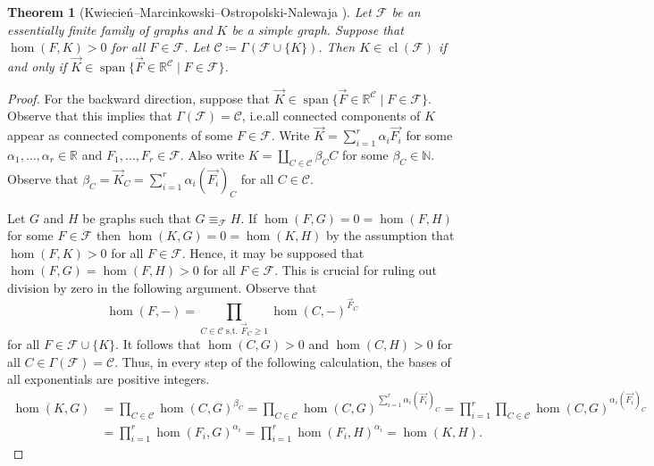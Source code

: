 \documentclass[3p,final]{elsarticle}
\DeclareMathOperator{\spn}{span}
\DeclareMathOperator{\cl}{cl}
\newtheorem{theorem}{Theorem}
\begin{document}
	
	\begin{theorem}[Kwiecie{\'n}--Marcinkowski--Ostropolski-Nalewaja \cite{kwiecien_determinacy_2022}] \label{thm:kwiecien22}
		Let $\mathcal{F}$ be an essentially finite family of graphs and $K$ be a simple graph. 
		Suppose that $\hom(F, K) > 0$ for all $F \in \mathcal{F}$.
		Let $\mathcal{C} \coloneqq \Gamma(\mathcal{F} \cup \{K\})$.
		Then $K \in \cl(\mathcal{F})$ if and only if $\vec{K} \in \spn \{\vec{F} \in \mathbb{R}^{\mathcal{C}} \mid F \in \mathcal{F}\}$.
	\end{theorem}
	\begin{proof}
		For the backward direction, suppose that $\vec{K} \in \spn \{\vec{F} \in \mathbb{R}^{\mathcal{C}} \mid F \in \mathcal{F}\}$. 
		Observe that this implies that $\Gamma(\mathcal{F}) = \mathcal{C}$, i.e.\@ all connected components of $K$ appear as connected components of some $F \in \mathcal{F}$.
		Write $\vec{K} = \sum_{i=1}^r \alpha_i \vec{F_i}$ for some $\alpha_1, \dots, \alpha_r \in \mathbb{R}$ and $F_1, \dots, F_r \in \mathcal{F}$.
		Also write $K = \coprod_{C \in \mathcal{C}} \beta_C C$ for some $\beta_C \in \mathbb{N}$.
		Observe that $\beta_C = \vec{K}_C = \sum_{i=1}^r \alpha_i (\vec{F_i})_C$ for all $C \in \mathcal{C}$.
		
		Let $G$ and $H$ be graphs such that $G \equiv_{\mathcal{F}} H$. If $\hom(F, G) = 0 = \hom(F, H)$ for some $F \in \mathcal{F}$ then $\hom(K, G) = 0 = \hom(K, H)$ by the assumption that $\hom(F, K) > 0$ for all $F \in \mathcal{F}$. 
		Hence, it may be supposed that $\hom(F, G) = \hom(F, H) > 0$ for all $F \in \mathcal{F}$.
		This is crucial for ruling out division by zero in the following argument.
		Observe that
		\[
		\hom(F, -) = \prod_{C \in \mathcal{C} \text{ s.t. } \vec{F}_C \geq 1} \hom(C, -)^{\vec{F}_C}
		\]
		for all $F \in \mathcal{F} \cup \{K\}$. 
		It follows that $\hom(C, G) > 0$ and $\hom(C, H) > 0$ for all $C \in \Gamma(\mathcal{F}) = \mathcal{C}$. 
		Thus, in every step of the following calculation, the bases of all exponentials are positive integers.
		\begin{align*}
			\hom(K, G) 
			&= \prod_{C \in \mathcal{C}} \hom(C, G)^{\beta_C}
			= \prod_{C \in \mathcal{C}} \hom(C, G)^{\sum_{i=1}^r \alpha_i (\vec{F_i})_C}
			= \prod_{i=1}^r \prod_{C \in \mathcal{C}}  \hom(C, G)^{\alpha_i(\vec{F_i})_C} \\
			&= \prod_{i=1}^r \hom(F_i, G)^{\alpha_i}
			= \prod_{i=1}^r \hom(F_i, H)^{\alpha_i}
			= \hom(K, H).
		\end{align*}
		

\end{proof}
\end{document}
